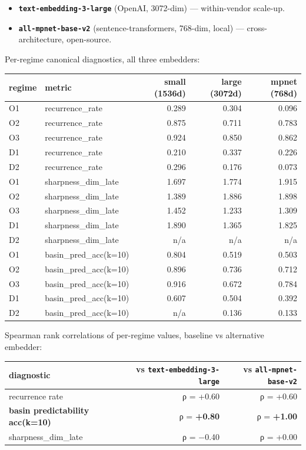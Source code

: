 \documentclass{article}
\theoremstyle{plain}
\theoremstyle{definition}
\begin{document}
\begin{itemize}
  \item \textbf{\texttt{text-embedding-3-large}} (OpenAI, 3072-dim) — within-vendor
  scale-up.
  \item \textbf{\texttt{all-mpnet-base-v2}} (sentence-transformers, 768-dim, local) —
  cross-architecture, open-source.
\end{itemize}

Per-regime canonical diagnostics, all three embedders:

\begin{table}[h!]
\centering
\small
\begin{tabular}{llrrr}
\toprule
regime & metric & small (1536d) & large (3072d) & mpnet (768d) \\
\midrule
O1 & recurrence\_rate & 0.289 & 0.304 & 0.096 \\
O2 & recurrence\_rate & 0.875 & 0.711 & 0.783 \\
O3 & recurrence\_rate & 0.924 & 0.850 & 0.862 \\
D1 & recurrence\_rate & 0.210 & 0.337 & 0.226 \\
D2 & recurrence\_rate & 0.296 & 0.176 & 0.073 \\
O1 & sharpness\_dim\_late & 1.697 & 1.774 & 1.915 \\
O2 & sharpness\_dim\_late & 1.389 & 1.886 & 1.898 \\
O3 & sharpness\_dim\_late & 1.452 & 1.233 & 1.309 \\
D1 & sharpness\_dim\_late & 1.890 & 1.365 & 1.825 \\
D2 & sharpness\_dim\_late & n/a & n/a & n/a \\
O1 & basin\_pred\_acc(k=10) & 0.804 & 0.519 & 0.503 \\
O2 & basin\_pred\_acc(k=10) & 0.896 & 0.736 & 0.712 \\
O3 & basin\_pred\_acc(k=10) & 0.916 & 0.672 & 0.784 \\
D1 & basin\_pred\_acc(k=10) & 0.607 & 0.504 & 0.392 \\
D2 & basin\_pred\_acc(k=10) & n/a & 0.136 & 0.133 \\
\bottomrule
\end{tabular}
\end{table}

Spearman rank correlations of per-regime values, baseline vs
alternative embedder:

\begin{table}[h!]
\centering
\small
\begin{tabular}{lrr}
\toprule
diagnostic & vs \texttt{text-embedding-3-large} & vs \texttt{all-mpnet-base-v2} \\
\midrule
recurrence rate & ρ = +0.60 & ρ = +0.60 \\
\textbf{basin predictability acc(k=10)} & ρ = \textbf{+0.80} & ρ = \textbf{+1.00} \\
sharpness\_dim\_late & ρ = −0.40 & ρ = +0.00 \\
\bottomrule
\end{tabular}
\end{table}
\end{document}
